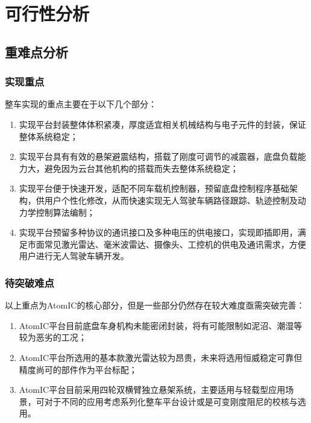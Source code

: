 \newpage

\section{可行性分析}

\subsection{重难点分析}

\subsubsection{实现重点}

整车实现的重点主要在于以下几个部分：

\begin{enumerate}
	
	\item 实现平台封装整体体积紧凑，厚度适宜相关机械结构与电子元件的封装，保证整体系统稳定；
	
	\item 实现平台具有有效的悬架避震结构，搭载了刚度可调节的减震器，底盘负载能力大，避免因为云台其他机构的搭载而失去整体系统稳定；
	
	\item 实现平台便于快速开发，适配不同车载机控制器，预留底盘控制程序基础架构，供用户个性化修改，从而快速实现无人驾驶车辆路径跟踪、轨迹控制及动力学控制算法编制；
	
	\item 实现平台预留多种协议的通讯接口及多种电压的供电接口，实现即插即用，满足市面常见激光雷达、毫米波雷达、摄像头、工控机的供电及通讯需求，方便用户进行无人驾驶车辆开发。
	
\end{enumerate}

\subsubsection{待突破难点}

以上重点为AtomIC的核心部分，但是一些部分仍然存在较大难度亟需突破完善：

\begin{enumerate}
	
	\item AtomIC平台目前底盘车身机构未能密闭封装，将有可能限制如泥沼、潮湿等较为恶劣的工况；
	
	\item AtomIC平台所选用的基本款激光雷达较为昂贵，未来将选用恒威稳定可靠但精度尚可的部件作为平台标配；
	
	\item AtomIC平台目前采用四轮双横臂独立悬架系统，主要适用与轻载型应用场景，可对于不同的应用考虑系列化整车平台设计或是可变刚度阻尼的校核与选用。
	
\end{enumerate}

